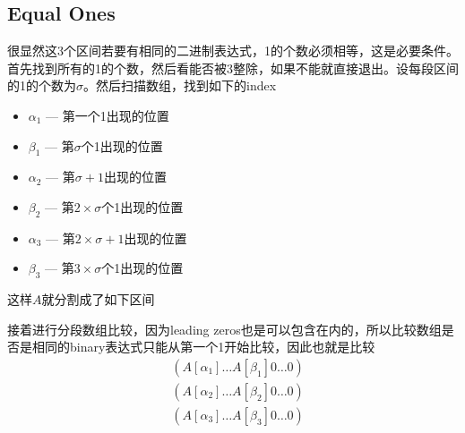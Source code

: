 \subsection{Equal Ones}
\begin{CJK*}{UTF8}{gbsn}
很显然这3个区间若要有相同的二进制表达式，1的个数必须相等，这是必要条件。首先找到所有的1的个数，然后看能否被3整除，如果不能就直接退出。设每段区间的1的个数为$\sigma$。然后扫描数组，找到如下的index
\begin{itemize}
\item $\alpha_1$ --- 第一个1出现的位置
\item $\beta_1$ --- 第$\sigma$个1出现的位置
\item $\alpha_2$ --- 第$\sigma+1$出现的位置
\item $\beta_2$ --- 第$2\times\sigma$个1出现的位置
\item $\alpha_3$ --- 第$2\times\sigma+1$出现的位置
\item $\beta_3$ --- 第$3\times\sigma$个1出现的位置
\end{itemize}
这样$A$就分割成了如下区间
\begin{figure}[H]
\end{figure}
\par
接着进行分段数组比较，因为leading zeros也是可以包含在内的，所以比较数组是否是相同的binary表达式只能从第一个1开始比较，因此也就是比较
\begin{align*}
&(A[\alpha_1]\ldots A[\beta_1]0\ldots0)\\
&(A[\alpha_2]\ldots A[\beta_2]0\ldots0)\\
&(A[\alpha_3]\ldots A[\beta_3]0\ldots0)
\end{align*}


\end{CJK*}

